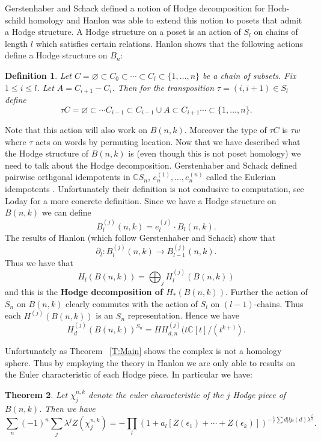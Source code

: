 \documentclass{amsart}
\newtheorem{theorem}{Theorem}[section]
\newtheorem{definition}[theorem]{Definition}
\newcommand{\C}{\mathbb{C}}
\newcommand{\full}{\{1, \ldots, n\}}
\begin{document}
Gerstenhaber and Schack \cite{GS} defined a notion of Hodge decomposition for Hoch-schild homology and Hanlon \cite{Hanlon}
was able to extend this notion to posets that admit a Hodge structure. A Hodge structure on a poset is an action of
$S_l$ on chains of length $l$ which satisfies certain 
relations. Hanlon shows that the following actions define a Hodge structure on $B_n$:
\begin{definition}
  Let $C =\varnothing \subset C_0 \subset \cdots \subset C_l \subset \full$ be a chain of subsets. Fix $1 \le i \le l$. 
  Let $A = C_{i+1} - C_i$. Then for the transposition $\tau = 
  (i, i+1) \in S_l$ define $$\tau C = \varnothing \subset \cdots C_{i-1} \subset C_{i-1} \cup A \subset C_{i+1} \cdots 
  \subset \full.$$
\end{definition}

Note that this action will also work on $B(n, k)$. Moreover the type of $\tau C$ is $\tau w$ where $\tau$ acts on words 
by permuting location. Now that we have described what the Hodge structure of $B(n, k)$ is (even though this is not poset
homology) we need to talk about the Hodge decomposition. Gerstenhaber and Schack defined pairwise orthgonal idempotents in
$\C S_n$, $e_n^{(1)}, \ldots, e_n^{(n)}$ called the Eulerian idempotents \cite{GS}. Unfortunately their definition is not
condusive to computation, see Loday \cite{Loday} for a more concrete definition. Since we have a Hodge structure on 
$B(n, k)$ we can define $$B_l^{(j)}(n, k) = e_l^{(j)} \cdot B_l(n, k).$$ The results of Hanlon (which follow Gerstenhaber
and Schack) show that $$\partial_l \colon B_l^{(j)}(n, k) \rightarrow B_{l-1}^{(j)}(n, k).$$ Thus we have that 
$$H_l(B(n, k)) = \bigoplus_j H_l^{(j)}(B(n, k))$$ and this is the {\bf Hodge decomposition of $H_*(B(n, k))$}. Further the
action of $S_n$ on $B(n, k)$ clearly commutes with the action of $S_l$ on $(l-1)$-chains. Thus each $H^{(j)}(B(n, k))$ is
an $S_n$ representation. Hence we have
\begin{equation}
  H_d^{(j)}(B(n, k))^{S_n} = HH_{d, n}^{(j)}(t\C[t]/(t^{k+1}).
\end{equation}

Unfortunately as Theorem ~\ref{T:Main} shows the complex is not a homology sphere. Thus by employing the theory in Hanlon 
\cite{Hanlon} we are only able to results on the Euler characteristic of each Hodge piece. In particular we have:

\begin{theorem} \label{T:Hodge} Let $\chi_j^{n, k}$ denote the euler characteristic of the $j$ Hodge piece of $B(n, k)$. 
Then we have $$\sum_n (-1)^n \sum_j \lambda^j Z(\chi_j^{n, k}) = - \prod_l (1 + a_l[Z(\epsilon_1) + \cdots + 
Z(\epsilon_k)])^{-\frac{1}{l}\sum{d|l} \mu(d) \lambda^{\frac{l}{d}}}.$$
\end{theorem} 
\end{document}
